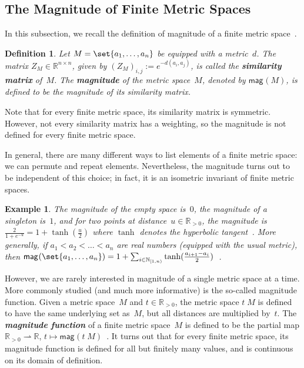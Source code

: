 \documentclass[11pt]{article}
\theoremstyle{plain}
\newtheorem{example}[theorem]{Example}
\newtheorem{definition}[theorem]{Definition}
\theoremstyle{definition}
\newcommand{\df}[1]{\emph{\textbf{#1}}}  %
\newcommand{\NN}{\mathbb{N}}
\newcommand{\RR}{\mathbb{R}}
\newcommand{\intco}[3][\RR]{{#1}_{[#2, #3)}}
\newcommand{\parto}{\mathrel{\rightharpoonup}}  %
\newcommand{\mg}[1][]{\mathsf{mag}_{#1}}
\begin{document}
\subsection{The Magnitude of Finite Metric Spaces}\label{subsection:finite-metric-space-magnitude}

In this subsection, we recall the definition of magnitude of a finite metric space~\cite{leinster2010}.

\begin{definition}\label{definition:finite-metric-space-magnitude}
Let $M = \set{a_1, \ldots, a_n}$ be equipped with a metric~$d$. The matrix $Z_M \in \RR^{n \times n}$, given by $(Z_M)_{i, j} := e^{-d(a_i, a_j)}$, is called the \df{similarity matrix} of~$M$.
The \df{magnitude} of the metric space~$M$, denoted by $\mg(M)$, is defined to be the magnitude of its similarity matrix.
\end{definition}

Note that for every finite metric space, its similarity matrix is symmetric. However, not every similarity matrix has a weighting, so the magnitude is not defined for every finite metric space.

In general, there are many different ways to list elements of a finite metric space: we can permute and repeat elements. Nevertheless, the magnitude turns out to be independent of this choice; in fact, it is an isometric invariant of finite metric spaces.

\begin{example}
The magnitude of the empty space is~$0$, the magnitude of a singleton is~$1$, and for two points at distance~$u \in \RR_{> 0}$, the magnitude is $\frac{2}{1 + e^{-u}} = 1 + \tanh(\frac{u}{2})$ where $\tanh$ denotes the hyperbolic tangent~\cite[Examples~2.1.1]{leinster2010}. More generally, if $a_1 < a_2 < \ldots < a_n$ are real numbers (equipped with the usual metric), then $\mg(\set{a_1, \ldots, a_n}) = 1 + \sum_{i \in \intco[\NN]{1}{n}} \tanh(\frac{a_{i+1} - a_i}{2})$~\cite[Corollary~2.3.4]{leinster2010}.
\end{example}

However, we are rarely interested in magnitude of a single metric space at a time. More commonly studied (and much more informative) is the so-called magnitude function. Given a metric space~$M$ and $t \in \RR_{> 0}$, the metric space $t\;\!M$ is defined to have the same underlying set as~$M$, but all distances are multiplied by~$t$. The \df{magnitude function} of a finite metric space~$M$ is defined to be the partial map $\RR_{> 0} \parto \RR$, $t \mapsto \mg(t\;\!M)$~\cite{leinster2010}. It turns out that for every finite metric space, its magnitude function is defined for all but finitely many values, and is continuous on its domain of definition.
\end{document}
